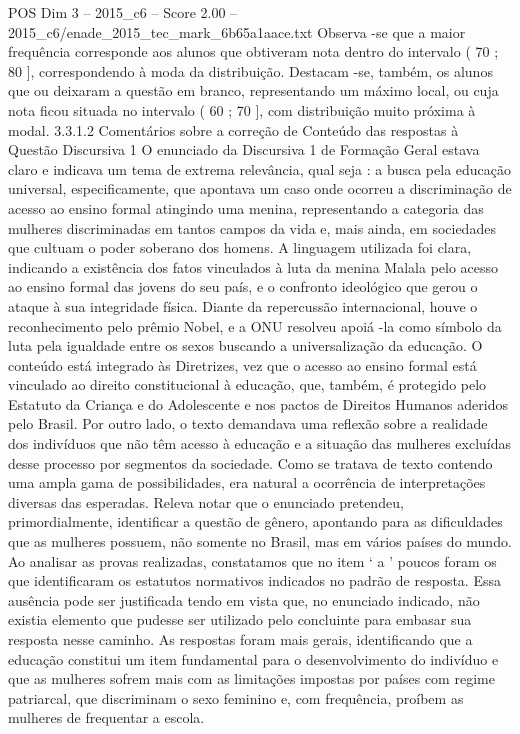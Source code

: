 \begin{textsample}{POS Dim 3 – 2015\_c6 – Score 2.00 – 2015\_c6/enade\_2015\_tec\_mark\_6b65a1aace.txt}
Observa -se que a maior frequência corresponde aos alunos que obtiveram nota dentro do intervalo ( 70 ; 80 ], correspondendo à moda da distribuição.
Destacam -se, também, os alunos que ou deixaram a questão em branco, representando um máximo local, ou cuja nota ficou situada no intervalo ( 60 ; 70 ], com distribuição muito próxima à modal. 3.3.1.2 Comentários sobre a correção de Conteúdo das respostas à Questão Discursiva 1 O enunciado da Discursiva 1 de Formação Geral estava claro e indicava um tema de extrema relevância, qual seja : a busca pela educação universal, especificamente, que apontava um caso onde ocorreu a discriminação de acesso ao ensino formal atingindo uma menina, representando a categoria das mulheres discriminadas em tantos campos da vida e, mais ainda, em sociedades que cultuam o poder soberano dos homens.
A linguagem utilizada foi clara, indicando a existência dos fatos vinculados à luta da menina Malala pelo acesso ao ensino formal das jovens do seu país, e o confronto ideológico que gerou o ataque à sua integridade física.
Diante da repercussão internacional, houve o reconhecimento pelo prêmio Nobel, e a ONU resolveu apoiá -la como símbolo da luta pela igualdade entre os sexos buscando a universalização da educação.
O conteúdo está integrado às Diretrizes, vez que o acesso ao ensino formal está vinculado ao direito constitucional à educação, que, também, é protegido pelo Estatuto da Criança e do Adolescente e nos pactos de Direitos Humanos aderidos pelo Brasil.
Por outro lado, o texto demandava uma reflexão sobre a realidade dos indivíduos que não têm acesso à educação e a situação das mulheres excluídas desse processo por segmentos da sociedade.
Como se tratava de texto contendo uma ampla gama de possibilidades, era natural a ocorrência de interpretações diversas das esperadas.
Releva notar que o enunciado pretendeu, primordialmente, identificar a questão de gênero, apontando para as dificuldades que as mulheres possuem, não somente no Brasil, mas em vários países do mundo.
Ao analisar as provas realizadas, constatamos que no item ‘ a ’ poucos foram os que identificaram os estatutos normativos indicados no padrão de resposta.
Essa ausência pode ser justificada tendo em vista que, no enunciado indicado, não existia elemento que pudesse ser utilizado pelo concluinte para embasar sua resposta nesse caminho.
As respostas foram mais gerais, identificando que a educação constitui um item fundamental para o desenvolvimento do indivíduo e que as mulheres sofrem mais com as limitações impostas por países com regime patriarcal, que discriminam o sexo feminino e, com frequência, proíbem as mulheres de frequentar a escola.

\end{textsample}
